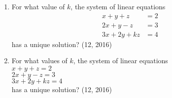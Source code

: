 \begin{enumerate}[label=\thesubsection.\arabic*,ref=\thesubsection.\theenumi]
\item For what value of $k$, the system of linear equations
      \begin{align*}
          x+y+z    & = 2 \\
          2x+y-z   & =3  \\
          3x+2y+kz & =4
      \end{align*}
      has a unique solution? \hfill (12, 2016)
\item For what values of $k$, the system of linear equations\\
      $x+y+z=2$\\
      $2x+y-z=3$\\
      $3x+2y+kz=4$\\
      has a unique solution? \hfill (12, 2016)
\end{enumerate}
